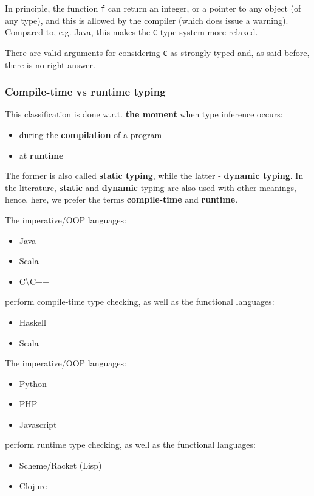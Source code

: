 In principle, the function \texttt{f} can return an integer, or a pointer to any object (of any type), and this is allowed by the compiler (which does issue a warning). Compared to, e.g. Java, this makes the \texttt{C} type system more relaxed.

There are valid arguments for considering \texttt{C} as strongly-typed and, as said before, there is no right answer.

\subsubsection*{ Compile-time vs runtime typing }

This classification is done w.r.t. \textbf{the moment} when type inference occurs:
\begin{itemize}
	\item  during the \textbf{compilation} of a program
	\item  at \textbf{runtime}
\end{itemize}

The former is also called \textbf{static typing}, while the latter - \textbf{dynamic typing}. In the literature, \textbf{static} and \textbf{dynamic} typing are also used with other meanings, hence, here, we prefer the terms \textbf{compile-time} and \textbf{runtime}.

The imperative/OOP languages:
\begin{itemize}
	\item  Java
	\item  Scala
	\item  C\textbackslash C++
\end{itemize}

perform compile-time type checking, as well as the functional languages:
\begin{itemize}
	\item  Haskell 
	\item  Scala
\end{itemize}

The imperative/OOP languages:
\begin{itemize}
	\item  Python
	\item  PHP
	\item  Javascript
\end{itemize}

perform runtime type checking, as well as the functional languages:
\begin{itemize}
	\item  Scheme/Racket (Lisp)
	\item  Clojure
\end{itemize}

